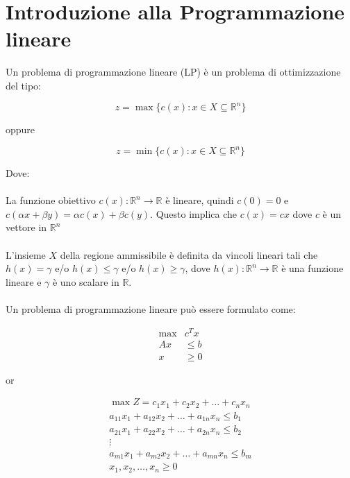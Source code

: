 \documentclass[a4paper, 11pt]{article}
\begin{document}
        

    \section{Introduzione alla Programmazione lineare}
        Un problema di programmazione lineare (LP) è un problema di ottimizzazione del tipo:

        \[
            z = \max \{c(x): x \in X \subseteq \mathbb{R}^n \}
        \]
        
        oppure 

        \[
            z = \min \{c(x): x \in X \subseteq \mathbb{R}^n \}
        \]
        
        Dove:
            \paragraph{} La funzione obiettivo $c(x): \mathbb{R}^n \rightarrow \mathbb{R}$ è lineare, quindi $c(0) = 0$ e $c(\alpha x + \beta y) = \alpha c(x)+\beta c(y)$. 
            Questo implica che $c(x) = cx$ dove $c$ è un vettore in $\mathbb{R}^n$
            \paragraph{}  L'insieme $X$ della regione ammissibile è definita da vincoli lineari tali che $h(x) = \gamma$ e/o $h(x)\le \gamma$ e/o $h(x) \ge \gamma$, dove $h(x): \mathbb{R}^n \rightarrow \mathbb{R}$ è una funzione lineare e $\gamma$ è uno scalare in $\mathbb{R}$.
        
        \paragraph{}
        Un problema di programmazione lineare può essere formulato come:

        \begin{align*}
            \max & c^T x \\
            Ax &\leq b \\
            x &\geq 0
        \end{align*}
        
        or
        
        \begin{align*}
            \max Z = c_1 x_1 + c_2 x_2 + \dots + c_n x_n \\
            a_{11} x_1 + a_{12} x_2 + \dots + a_{1n} x_n \leq b_1 \\
            a_{21} x_1 + a_{22} x_2 + \dots + a_{2n} x_n \leq b_2 \\
            \vdots \\
            a_{m1} x_1 + a_{m2} x_2 + \dots + a_{mn} x_n \leq b_m \\
            x_1, x_2, \dots, x_n \geq 0
        \end{align*}
        
\end{document}
